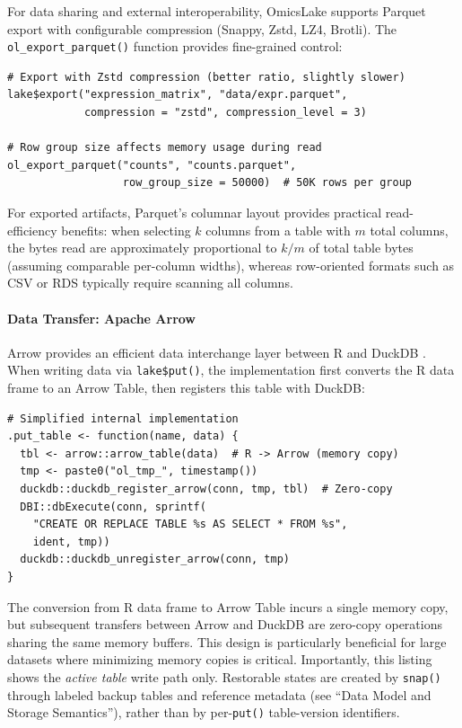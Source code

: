 \documentclass[11pt,a4paper]{article}
\begin{document}
For data sharing and external interoperability, OmicsLake supports Parquet export with configurable compression (Snappy, Zstd, LZ4, Brotli). The \texttt{ol\_export\_parquet()} function provides fine-grained control:

\begin{lstlisting}[caption={Parquet export with compression options}]
# Export with Zstd compression (better ratio, slightly slower)
lake$export("expression_matrix", "data/expr.parquet",
            compression = "zstd", compression_level = 3)

# Row group size affects memory usage during read
ol_export_parquet("counts", "counts.parquet",
                  row_group_size = 50000)  # 50K rows per group
\end{lstlisting}

For exported artifacts, Parquet's columnar layout provides practical read-efficiency benefits: when selecting $k$ columns from a table with $m$ total columns, the bytes read are approximately proportional to $k/m$ of total table bytes (assuming comparable per-column widths), whereas row-oriented formats such as CSV or RDS typically require scanning all columns.

\paragraph{Data Transfer: Apache Arrow}
Arrow provides an efficient data interchange layer between R and DuckDB \citep{arrow2016}. When writing data via \texttt{lake\$put()}, the implementation first converts the R data frame to an Arrow Table, then registers this table with DuckDB:

\begin{lstlisting}[caption={Internal data flow for put() operation (active table write path)}]
# Simplified internal implementation
.put_table <- function(name, data) {
  tbl <- arrow::arrow_table(data)  # R -> Arrow (memory copy)
  tmp <- paste0("ol_tmp_", timestamp())
  duckdb::duckdb_register_arrow(conn, tmp, tbl)  # Zero-copy
  DBI::dbExecute(conn, sprintf(
    "CREATE OR REPLACE TABLE %s AS SELECT * FROM %s",
    ident, tmp))
  duckdb::duckdb_unregister_arrow(conn, tmp)
}
\end{lstlisting}

The conversion from R data frame to Arrow Table incurs a single memory copy, but subsequent transfers between Arrow and DuckDB are zero-copy operations sharing the same memory buffers. This design is particularly beneficial for large datasets where minimizing memory copies is critical. Importantly, this listing shows the \emph{active table} write path only. Restorable states are created by \texttt{snap()} through labeled backup tables and reference metadata (see ``Data Model and Storage Semantics''), rather than by per-\texttt{put()} table-version identifiers.
\end{document}
